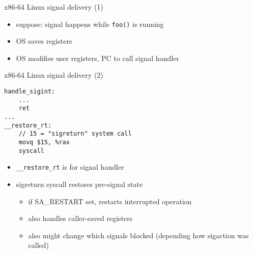 \usetikzlibrary{arrows.meta,matrix}
\begin{frame}{x86-64 Linux signal delivery (1)}
\begin{itemize}
\item suppose: signal happens while {\tt foo()} is running
\item OS saves registers 
\item OS modifies user registers, PC to call signal handler
\end{itemize}
\end{frame}

\begin{frame}[fragile,label=sigReturn]{x86-64 Linux signal delivery (2)}
\begin{lstlisting}
handle_sigint:
    ...
    ret
...
__restore_rt:
    // 15 = "sigreturn" system call
    movq $15, %rax
    syscall
\end{lstlisting}
\begin{itemize}
\item {\tt \_\_restore\_rt} is  for signal handler
\item sigreturn syscall restores pre-signal state
\begin{itemize}
    \item if SA\_RESTART set, restarts interrupted operation
    \item also handles caller-saved registers
    \item also might change which signals blocked (depending how sigaction was called)
\end{itemize}
\end{itemize}
\end{frame}


